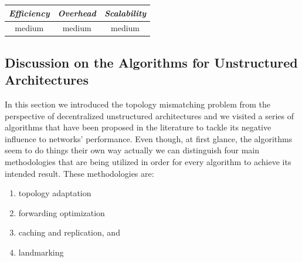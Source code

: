 \begin{center}
\begin{tabular}{ccc}
\emph{Efficiency} & \emph{Overhead} & \emph{Scalability} \\
\hline
medium &
medium &
medium
\end{tabular}
\end{center}

\subsection{Discussion on the Algorithms for Unstructured Architectures}


In this section we introduced the topology mismatching problem from the
perspective of decentralized unstructured architectures and we visited a series
of algorithms that have been proposed in the literature to tackle its negative
influence to networks' performance. Even though, at first glance, the algorithms
seem to do things their own way actually we can distinguish four main
methodologies that are being utilized in order for every algorithm to achieve
its intended result. These methodologies are:
\begin{enumerate}
  \item topology adaptation
  \item forwarding optimization
  \item caching and replication, and
  \item landmarking
\end{enumerate}

